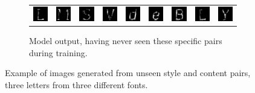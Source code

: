 \begin{figure}
	\begin{subfigure}[t]{\textwidth}
		\begin{tabu} to \textwidth {XXXXXXXXX}
			\includegraphics[scale=1]{tensors/sandc/valid/synth/Georgia-76} &
			\includegraphics[scale=1]{tensors/sandc/valid/synth/Georgia-77} &
			\includegraphics[scale=1]{tensors/sandc/valid/synth/Georgia-83} &
			\includegraphics[scale=1]{tensors/sandc/valid/synth/VeraMoIt-86} &
			\includegraphics[scale=1]{tensors/sandc/valid/synth/VeraMoIt-100} &
			\includegraphics[scale=1]{tensors/sandc/valid/synth/VeraMoIt-101} &
			\includegraphics[scale=1]{tensors/sandc/valid/synth/VeraMono-66} &
			\includegraphics[scale=1]{tensors/sandc/valid/synth/VeraMono-76} &
			\includegraphics[scale=1]{tensors/sandc/valid/synth/VeraMono-89} 
		\end{tabu}
		\caption{Model output, having never seen these specific pairs during training.}
	\end{subfigure}
\caption{Example of images generated from unseen style and content pairs, three letters from
		 three different fonts.}
\label{fig:sandc-valid}
\end{figure}


